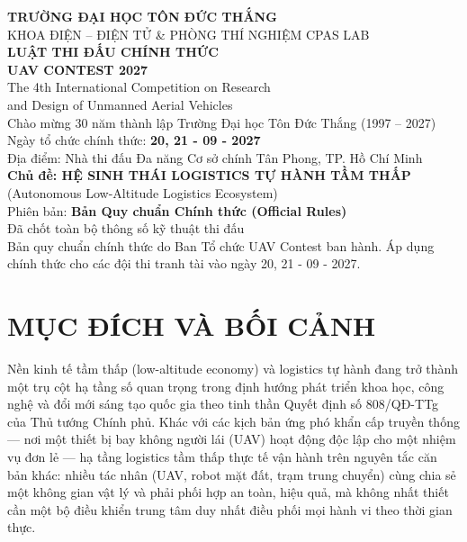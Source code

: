 \documentclass[12pt,a4paper]{article}
\begin{document}
\begin{titlepage}
\centering
\vspace*{1.2cm}
{\Large\bfseries TRƯỜNG ĐẠI HỌC TÔN ĐỨC THẮNG}\\[0.2cm]
{\large KHOA ĐIỆN – ĐIỆN TỬ \& PHÒNG THÍ NGHIỆM CPAS LAB}\\[1.6cm]

{\Huge\bfseries LUẬT THI ĐẤU CHÍNH THỨC}\\[0.4cm]
{\Large\bfseries UAV CONTEST 2027}\\[0.6cm]
{\large The 4th International Competition on Research}\\
{\large and Design of Unmanned Aerial Vehicles}\\[0.6cm]
{\large Chào mừng 30 năm thành lập Trường Đại học Tôn Đức Thắng (1997 -- 2027)}\\[0.3cm]
{\large Ngày tổ chức chính thức: \textbf{20, 21 - 09 - 2027}}\\[0.3cm]
{\normalsize Địa điểm: Nhà thi đấu Đa năng Cơ sở chính Tân Phong, TP. Hồ Chí Minh}\\[2.0cm]

{\large\bfseries Chủ đề: HỆ SINH THÁI LOGISTICS TỰ HÀNH TẦM THẤP}\\
{\normalsize (Autonomous Low-Altitude Logistics Ecosystem)}\\[2.5cm]

{\normalsize Phiên bản: \textbf{Bản Quy chuẩn Chính thức (Official Rules)}}\\[0.3cm]
{\normalsize Đã chốt toàn bộ thông số kỹ thuật thi đấu}\\[2cm]

\vfill
{\small Bản quy chuẩn chính thức do Ban Tổ chức UAV Contest ban hành. Áp dụng chính thức cho các đội thi tranh tài vào ngày 20, 21 - 09 - 2027.}
\end{titlepage}

\tableofcontents
\newpage

\section{MỤC ĐÍCH VÀ BỐI CẢNH}

Nền kinh tế tầm thấp (low-altitude economy) và logistics tự hành đang trở thành một trụ cột hạ tầng số quan trọng trong định hướng phát triển khoa học, công nghệ và đổi mới sáng tạo quốc gia theo tinh thần Quyết định số 808/QĐ-TTg của Thủ tướng Chính phủ. Khác với các kịch bản ứng phó khẩn cấp truyền thống — nơi một thiết bị bay không người lái (UAV) hoạt động độc lập cho một nhiệm vụ đơn lẻ — hạ tầng logistics tầm thấp thực tế vận hành trên nguyên tắc căn bản khác: nhiều tác nhân (UAV, robot mặt đất, trạm trung chuyển) cùng chia sẻ một không gian vật lý và phải phối hợp an toàn, hiệu quả, mà không nhất thiết cần một bộ điều khiển trung tâm duy nhất điều phối mọi hành vi theo thời gian thực.
\end{document}

